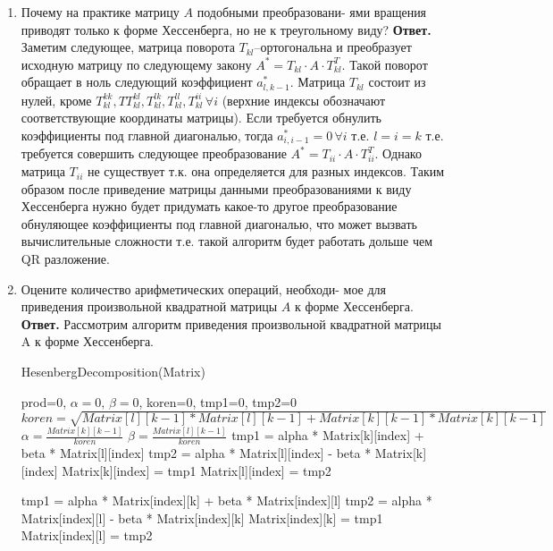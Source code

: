 \documentclass{article}
\begin{document}
\begin{enumerate}
        \item Почему на практике матрицу $A$ подобными преобразовани-
        ями вращения приводят только к форме Хессенберга, но
        не к треугольному виду?
        \newline 
        {\bfseries Ответ. } 
        Заметим следующее, матрица поворота $T_{kl}$--ортогональна и преобразует исходную матрицу по следующему закону $A^*= T_{kl} \cdot A \cdot T_{kl}^T$. Такой поворот обращает в ноль следующий коэффициент $a^*_{l,k-1}$. Матрица $T_{kl}$ состоит из нулей, кроме $T^{kk}_{kl}, TT^{kl}_{kl}, T^{lk}_{kl}, T^{ll}_{kl}, T^{ii}_{kl}\, \forall i$ (верхние индексы обозначают соответствующие координаты матрицы). Если требуется обнулить коэффициенты под главной диагональю, тогда $a^*_{i,i-1}=0 \, \forall i$ т.е. $l=i=k$ т.е. требуется совершить следующее преобразование $A^*= T_{ii} \cdot A \cdot T_{ii}^T$. Однако матрица $T_{ii}$ не существует т.к. она определяется для разных индексов. Таким образом после приведение матрицы данными преобразованиями к виду Хессенберга нужно будет придумать какое-то другое преобразование обнуляющее коэффициенты под главной диагональю, что может вызвать вычислительные сложности т.е. такой алгоритм будет работать дольше чем QR разложение.
        \item Оцените количество арифметических операций, необходи-
        мое для приведения произвольной квадратной матрицы $A$
        к форме Хессенберга.
        \newline 
        {\bfseries Ответ. } 
        Рассмотрим алгоритм приведения произвольной квадратной матрицы A к форме Хессенберга.
	
	
	\noindent HesenbergDecomposition(Matrix)
	
	\begin{algorithmic}[1]
		\State prod=0, $\alpha=0, \, \beta=0$, koren=0, tmp1=0, tmp2=0
				\State $koren = \sqrt{Matrix[l][k - 1] * Matrix[l][k - 1] + Matrix[k][k - 1] * Matrix[k][k - 1]}$
				\State $\alpha = \frac{Matrix[k][k - 1]}{koren}$
				\State $\beta = \frac{Matrix[l][k - 1]}{koren}$
					\State tmp1 = alpha * Matrix[k][index] + beta * Matrix[l][index]
					\State tmp2 = alpha * Matrix[l][index] - beta * Matrix[k][index]
					\State Matrix[k][index] = tmp1
					\State Matrix[l][index] = tmp2
					
				\EndFor
					\State tmp1 = alpha * Matrix[index][k] + beta * Matrix[index][l]
					\State tmp2 = alpha * Matrix[index][l] - beta * Matrix[index][k]
					\State Matrix[index][k] = tmp1
					\State Matrix[index][l] = tmp2
				\EndFor
			\EndFor
		\EndFor
	\end{algorithmic}
	

\end{enumerate}
\end{document}
